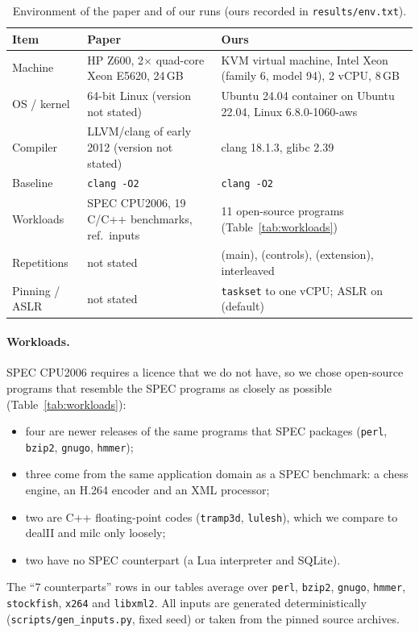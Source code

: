 \documentclass[10pt,a4paper]{article}
\newcommand{\cmd}[1]{\texttt{#1}}
\begin{document}
\begin{table}[t]
\centering\small
\caption{Environment of the paper and of our runs (ours recorded in \cmd{results/env.txt}).}\label{tab:env}
\begin{tabularx}{\linewidth}{lXX}
\toprule
Item & Paper~\cite{asan} & Ours \\
\midrule
Machine & HP Z600, 2$\times$ quad-core Xeon E5620, 24\,GB & KVM virtual machine, Intel Xeon (family 6, model 94), 2 vCPU, 8\,GB \\
OS / kernel & 64-bit Linux (version not stated) & Ubuntu 24.04 container on Ubuntu 22.04, Linux 6.8.0-1060-aws \\
Compiler & LLVM/clang of early 2012 (version not stated) & clang 18.1.3, glibc 2.39 \\
Baseline & \cmd{clang -O2} & \cmd{clang -O2} \\
Workloads & SPEC CPU2006, 19 C/C++ benchmarks, ref.\ inputs & 11 open-source programs (Table~\ref{tab:workloads}) \\
Repetitions & not stated & \MainRuns{} (main), \CtrlRuns{} (controls), \RzRuns{} (extension), interleaved \\
Pinning / ASLR & not stated & \cmd{taskset} to one vCPU; ASLR on (default) \\
\bottomrule
\end{tabularx}
\end{table}

\paragraph{Workloads.}
SPEC CPU2006 requires a licence that we do not have, so we chose open-source
programs that resemble the SPEC programs as closely as possible
(Table~\ref{tab:workloads}):
\begin{itemize}
\item four are newer releases of the same programs that SPEC packages
(\cmd{perl}, \cmd{bzip2}, \cmd{gnugo}, \cmd{hmmer});
\item three come from the same application domain as a SPEC benchmark: a chess
engine, an H.264 encoder and an XML processor;
\item two are C++ floating-point codes (\cmd{tramp3d}, \cmd{lulesh}), which we
compare to dealII and milc only loosely;
\item two have no SPEC counterpart (a Lua interpreter and SQLite).
\end{itemize}
The ``7 counterparts'' rows in our tables average over \cmd{perl},
\cmd{bzip2}, \cmd{gnugo}, \cmd{hmmer}, \cmd{stockfish}, \cmd{x264} and
\cmd{libxml2}. All inputs are generated deterministically
(\cmd{scripts/gen_inputs.py}, fixed seed) or taken from the pinned source
archives.
\end{document}
